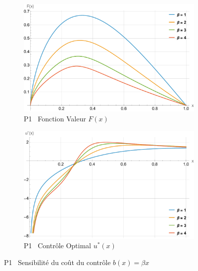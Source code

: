 \FloatBarrier\begin{figure}[htb]
    \centering
    \begin{subfigure}{0.45\linewidth}
        \includegraphics[width=\linewidth]{img/validation/P1/p1_B_value.pdf}
        \caption{P1 \textemdash~Fonction Valeur $F(x)$}\label{fig:BetaValueVisualisation1}
    \end{subfigure}
    \hfill
    \begin{subfigure}{0.45\linewidth}
        \includegraphics[width=\linewidth]{img/validation/P1/p1_B_control.pdf}
        \caption{P1 \textemdash~Contrôle Optimal $u^*(x)$}\label{fig:BetaControlVisualisation1}
    \end{subfigure}
    \caption{P1 \textemdash~Sensibilité du coût du contrôle $b(x)=\beta x$}\label{fig:BetaValueControlComparison}
\end{figure}
